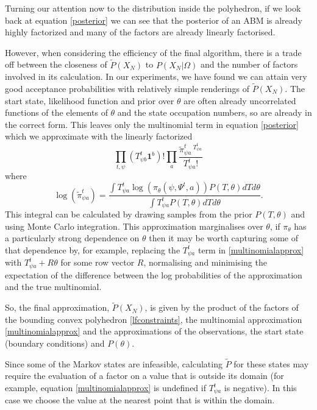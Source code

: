 \documentclass{article}
\begin{document}
Turning our attention now to the distribution inside the polyhedron, if we look back at equation \eqref{posterior} we can see that the posterior of an ABM is already highly factorized and many of the factors are already linearly factorised.

However, when considering the efficiency of the final algorithm, there is a trade off between the closeness of $\tilde{P}(X_N)$ to $P(X_N|\Omega)$ and the number of factors involved in its calculation. In our experiments, we have found we can attain very good acceptance probabilities with relatively simple renderings of $\tilde{P}(X_N)$. The start state, likelihood function and prior over $\theta$ are often already uncorrelated functions of the elements of $\theta$ and the state occupation numbers, so are already in the correct form. This leaves only the multinomial term in equation \eqref{posterior} which we approximate with the linearly factorized
\begin{equation}
\prod_{t, \psi}\left(T^t_{\psi b}\mathbf{1}^b\right)! \prod_a \frac{\tilde{\pi}^t_{\psi a}\,^{T^t_{\psi a}}}{T^t_{\psi a}!}
\label{multinomialapprox}
\end{equation}
where
\[
\log(\tilde{\pi}^t_{\psi a}) = \frac{\int T^t_{\psi a}\log\left(\pi_\theta(\psi, \Psi^t, a)\right)P(T,\theta) dT d\theta}{\int T^t_{\psi a}P(T,\theta) dT d\theta}.
\]
This integral can be calculated by drawing samples from the prior $P(T,\theta)$ and using Monte Carlo integration. This approximation marginalises over $\theta$, if $\pi_\theta$ has a particularly strong dependence on $\theta$ then it may be worth capturing some of that dependence by, for example, replacing the $T^t_{\psi a}$ term in \eqref{multinomialapprox} with $T^t_{\psi a} + R\theta$ for some row vector $R$, normalising and minimising the expectation of the difference between the log probabilities of the approximation and the true multinomial.

So, the final approximation, $\tilde{P}(X_N)$, is given by the product of the factors of the bounding convex polyhedron \eqref{lfconstraints}, the multinomial approximation \eqref{multinomialapprox} and the approximations of the observations, the start state (boundary conditions) and $P(\theta)$.

Since some of the Markov states are infeasible, calculating $\tilde{P}$ for these states may require the evaluation of a factor on a value that is outside its domain (for example, equation \eqref{multinomialapprox} is undefined if $T^t_{\psi a}$ is negative). In this case we choose the value at the nearest point that is within the domain.
\end{document}
